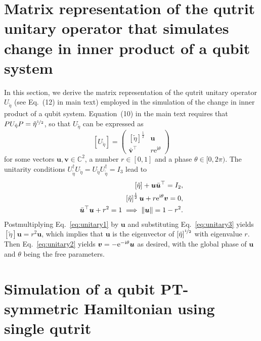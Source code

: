 \documentclass[amsmath,amssymb,aps,pra,superscriptaddress,twocolumn]{revtex4-2}
\begin{document}
\begin{appendix}
\section{{Matrix representation of the qutrit unitary operator that simulates
 change in inner product of a qubit system}}\label{sec:matrixUeta}
In this section, we derive the matrix representation of the qutrit unitary operator $U_{\tilde{\eta}}$
(see Eq.~(12) in main text) employed in the 
simulation of the change in inner product of a qubit system. Equation~(10) in the main text
requires that $PU_{\tilde{\eta}}P = \tilde{\eta}^{\nicefrac{1}{2}}$, so that
$U_{\tilde{\eta}}$ can be expressed as
\begin{equation}\label{eq:Utildeeta}
    [U_{\tilde{\eta}}] = \begin{pmatrix}
    \left[\tilde{\eta}\right]^{\frac12} & \bm{u} \\ {\bar{\bm{v}}}^\top &r\text{e}^{\text{i}\theta} 
    \end{pmatrix}
\end{equation}
for some vectors $\bm{u},\bm{v} \in \mathbb{C}^2$, a number $r \in [0,1]$ and a phase $\theta \in [0,2\pi)$.
The unitarity conditions $U_{\tilde{\eta}}^\dagger U_{\tilde{\eta}} = U_{\tilde{\eta}} U_{\tilde{\eta}}^\dagger = I_3$ lead to
\begin{align}
    \left[\tilde{\eta}\right] + {\bm{u}}\bar{\bm{u}}^\top  = I_2,
    \label{eq:unitary1}\\
    \left[\tilde{\eta}\right]^{\frac12}\bm{u} + r\text{e}^{{\rm i}\theta}\bm{v}=0,\label{eq:unitary2}\\   
    \bar{\bm{u}}^\top{\bm{u}}+r^2 =  1 \implies \|\bm{u}\| = 1-r^2 \label{eq:unitary3}.
\end{align}
Postmultiplying Eq.~\eqref{eq:unitary1} by $\bm{u}$ and substituting Eq.~\eqref{eq:unitary3} yields
$\left[\tilde{\eta}\right]\bm{u} = r^2\bm{u}$, which implies that $\bm{u}$ is the eigenvector
of $\left[\tilde{\eta}\right]^{\nicefrac{1}{2}}$ with eigenvalue $r$. Then Eq.~\eqref{eq:unitary2}
yields $\bm{v} = -\text{e}^{-{\rm i}\theta}\bm{u}$ as desired, 
with the global phase of $\bm{u}$ and $\theta$ being the free parameters.



\section{{Simulation of a qubit PT-symmetric Hamiltonian using single qutrit}}\label{sec:qubitPTsymmetry}


\end{appendix}
\end{document}
